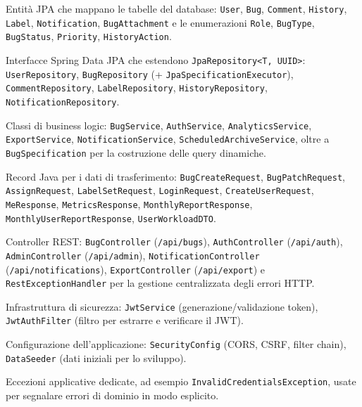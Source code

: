 ﻿\documentclass[a4paper,11pt]{article}
\begin{document}
\begin{description}[style=nextline]
\item[\texttt{model}] Entit\`a JPA che mappano le tabelle del database: \texttt{User}, \texttt{Bug}, \texttt{Comment}, \texttt{History}, \texttt{Label}, \texttt{Notification}, \texttt{BugAttachment} e le enumerazioni \texttt{Role}, \texttt{BugType}, \texttt{BugStatus}, \texttt{Priority}, \texttt{HistoryAction}.

\item[\texttt{repository}] Interfacce Spring Data JPA che estendono \texttt{JpaRepository<T, UUID>}: \texttt{UserRepository}, \texttt{BugRepository} (+ \texttt{JpaSpecificationExecutor}), \texttt{CommentRepository}, \texttt{LabelRepository}, \texttt{HistoryRepository}, \texttt{NotificationRepository}.

\item[\texttt{service}] Classi di business logic: \texttt{BugService}, \texttt{AuthService}, \texttt{AnalyticsService}, \texttt{ExportService}, \texttt{NotificationService}, \texttt{ScheduledArchiveService}, oltre a \texttt{BugSpecification} per la costruzione delle query dinamiche.

\item[\texttt{dto}] Record Java per i dati di trasferimento: \texttt{BugCreateRequest}, \texttt{BugPatchRequest}, \texttt{AssignRequest}, \texttt{LabelSetRequest}, \texttt{LoginRequest}, \texttt{CreateUserRequest}, \texttt{MeResponse}, \texttt{MetricsResponse}, \texttt{MonthlyReportResponse}, \texttt{MonthlyUserReportResponse}, \texttt{UserWorkloadDTO}.

\item[\texttt{controller}] Controller REST: \texttt{BugController} (\texttt{/api/bugs}), \texttt{AuthController} (\texttt{/api/auth}), \texttt{AdminController} (\texttt{/api/admin}), \texttt{NotificationController} (\texttt{/api/notifications}), \texttt{ExportController} (\texttt{/api/export}) e \texttt{RestExceptionHandler} per la gestione centralizzata degli errori HTTP.

\item[\texttt{security}] Infrastruttura di sicurezza: \texttt{JwtService} (generazione/validazione token), \texttt{JwtAuthFilter} (filtro per estrarre e verificare il JWT).

\item[\texttt{config}] Configurazione dell'applicazione: \texttt{SecurityConfig} (CORS, CSRF, filter chain), \texttt{DataSeeder} (dati iniziali per lo sviluppo).

\item[\texttt{exception}] Eccezioni applicative dedicate, ad esempio \texttt{InvalidCredentialsException}, usate per segnalare errori di dominio in modo esplicito.
\end{description}
\end{document}
